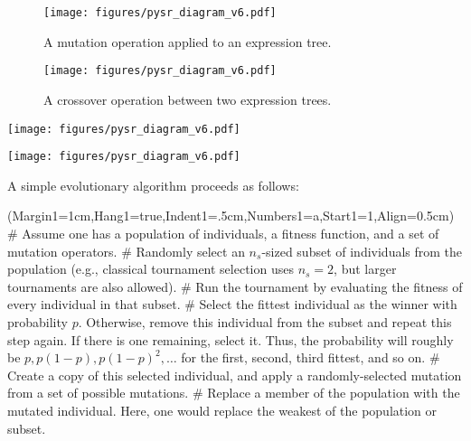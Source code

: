 \documentclass[letterpaper,twocolumn]{scrartcl}
\newcommand\pysr{\textsc{PySR}\xspace}
\begin{document}
\begin{linenumbers}
\begin{figure}[h!]
    \centering
    \texttt{[image: figures/pysr\_diagram\_v6.pdf]}
    \caption{A mutation operation applied to an expression tree.}
    \label{fig:mutations}
\end{figure}

\begin{figure}[h!]
    \centering
    \texttt{[image: figures/pysr\_diagram\_v6.pdf]}
    \caption{A crossover operation between two expression trees.}
    \label{fig:crossover}
\end{figure}

\begin{figure*}[h!]
    \centering
    \texttt{[image: figures/pysr\_diagram\_v6.pdf]}
    \caption{The inner loop of \pysr. A population of expressions is randomly subsampled. Among this subsample, a tournament is performed, and the winner is selected for breeding: either by mutation, crossover, simplification, or explicit optimization. Examples of mutation and crossover operations are visualized in \cref{fig:mutations,fig:crossover}.}
    \label{fig:evolution_loop}
\end{figure*}

\begin{figure*}[h!]
    \centering
    \texttt{[image: figures/pysr\_diagram\_v6.pdf]}
    \caption{The outer loop of \pysr. Several populations evolve independently according to the algorithm described in \cref{fig:evolution_loop}. At the end of a specified number of rounds of evolution, migration between islands is performed.}
    \label{fig:migration}
\end{figure*}


A simple evolutionary algorithm proceeds as follows:
\begin{easylist}
\ListProperties(Margin1=1cm,Hang1=true,Indent1=.5cm,Numbers1=a,Start1=1,Align=0.5cm)
# Assume one has a population of individuals, a fitness function, and a set of mutation operators.
\label{step:assumptions}
# Randomly select an $n_s$-sized subset of individuals from the population (e.g., classical tournament selection uses $n_s=2$, but larger tournaments are also allowed).
\label{step:sampling}
# Run the tournament by evaluating the fitness of every individual in that subset.
\label{step:prep_tournament}
# Select the fittest individual as the winner with probability $p$. Otherwise, remove this individual from the subset and repeat this step again.
If there is one remaining, select it.
Thus, the probability will roughly be $p, p(1-p), p(1-p)^2, \ldots$ for the first, second, third fittest, and so on. 
\label{step:select}
# Create a copy of this selected individual, and apply a randomly-selected mutation from a set of possible mutations.
\label{step:mutate}
# Replace a member of the population with the mutated individual. Here, one would replace the weakest of the population or subset.
\label{step:replace}
\end{easylist}


\end{linenumbers}
\end{document}
